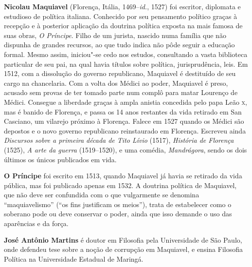 \textbf{Nicolau Maquiavel} (Florença, Itália, 1469--\textit{id.}, 1527) foi escritor, diplomata e estudioso de política italiana. Conhecido por seu pensamento político graças à recepção e à posterior aplicação da doutrina política exposta na mais famosa de suas obras, \textit{O Príncipe}. Filho de um jurista, nascido numa família que não dispunha de grandes recursos, ao que tudo indica não pôde seguir a educação formal. Mesmo assim, iniciou"-se cedo nos estudos, consultando a vasta biblioteca particular de seu pai, na qual havia títulos sobre política, jurisprudência, leis. Em 1512, com a dissolução do governo republicano, Maquiavel é destituído de seu cargo na chancelaria. Com a volta dos Médici ao poder, Maquiavel é preso, acusado sem provas de ter tomado parte num complô para matar Lourenço de Médici. Consegue a liberdade graças à ampla anistia concedida pelo papa Leão \textsc{x}, mas é banido de Florença, e passa os 14 anos restantes da vida retirado em San Casciano, um vilarejo próximo à Florença. Falece em 1527 quando os Médici são depostos e o novo governo republicano reinstaurado em Florença. Escreveu ainda \textit{Discursos sobre a primeira década de Tito Lívio} (1517), \textit{História de Florença} (1525), \textit{A arte da guerra} (1519--1520), e uma comédia, \textit{Mandrágora}, sendo os dois últimos os únicos publicados em vida. 

\textbf{O Príncipe} foi escrito em 1513, quando Maquiavel já havia se retirado da vida pública, mas foi publicado apenas em 1532. A doutrina política de Maquiavel, que não deve ser confundida com o que vulgarmente se denomina “maquiavelismo” (“os fins justificam os meios”), trata de estabelecer como o soberano pode ou deve conservar o poder, ainda que isso demande o uso das aparências e da força. 

\textbf{José Antônio Martins} é doutor em Filosofia pela Universidade de São Paulo, onde defendeu tese sobre a noção de corrupção em Maquiavel, e ensina Filosofia Política na Universidade Estadual de Maringá.


